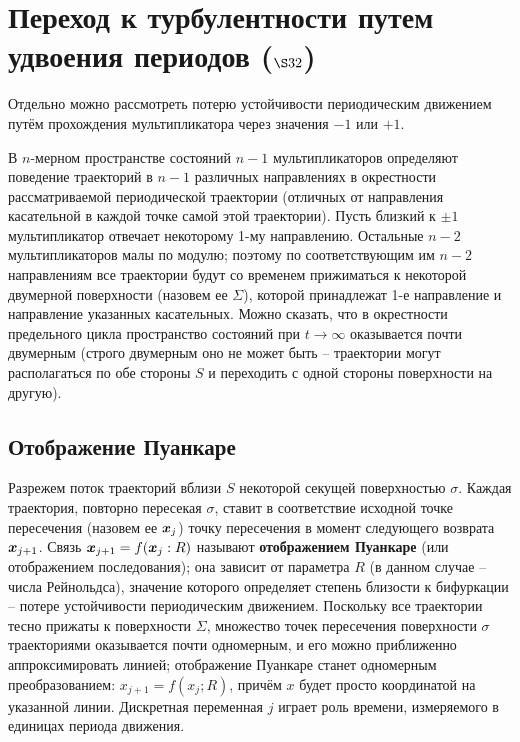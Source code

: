 \section{Переход к турбулентности путем удвоения периодов  \texorpdfstring{($\S 32$)}{Lg}}

Отдельно можно рассмотреть потерю устойчивости периодическим движением путём прохождения мультипликатора через значения $-1$ или $+1$.

В $n$-мерном пространстве состояний $n-1$ мультипликаторов 
определяют поведение траекторий в $n - 1$ различных направлениях в окрестности рассматриваемой периодической траектории 
(отличных от направления касательной в каждой точке самой 
этой траектории). Пусть близкий к $\pm 1$ мультипликатор отвечает некоторому 1-му направлению. Остальные $n - 2$ мультипликаторов малы по модулю; поэтому по соответствующим им 
$n - 2$ направлениям все траектории будут со временем прижиматься к некоторой двумерной поверхности (назовем ее $\Sigma$), которой принадлежат 1-е направление и направление указанных касательных. Можно сказать, что в окрестности предельного цикла 
пространство состояний при $t \to \infty$ оказывается почти двумерным (строго двумерным оно не может быть -- траектории могут 
располагаться по обе стороны $S$ и переходить с одной стороны 
поверхности на другую). 


\subsection{Отображение Пуанкаре}
Разрежем поток траекторий вблизи $S$ некоторой секущей поверхностью $\sigma$. 
Каждая траектория, повторно пересекая $\sigma$, ставит в соответствие исходной точке пересечения (назовем ее $\mbox{\boldmath $x$}_j$) точку пересечения в момент следующего возврата $\mbox{\boldmath $x$}_{j+1}$. Связь $\mbox{\boldmath $x$}_{j+1} = f (\mbox{\boldmath $x$}_j:R)$ называют \textbf{отображением Пуанкаре} (или отображением последования); она зависит от параметра $R$ (в данном случае -- числа Рейнольдса), значение которого определяет степень близости к бифуркации -- потере 
устойчивости периодическим движением. 
Поскольку все траектории тесно прижаты к поверхности $\Sigma$, множество точек пересечения поверхности $\sigma$ траекториями оказывается почти одномерным, и его можно приближенно аппроксимировать линией; 
отображение Пуанкаре станет одномерным преобразованием: $x_{j+1} = f(x_j;R)$, причём $x$ будет просто координатой на указанной линии. Дискретная переменная $j$ играет роль времени, измеряемого в единицах периода движения.

